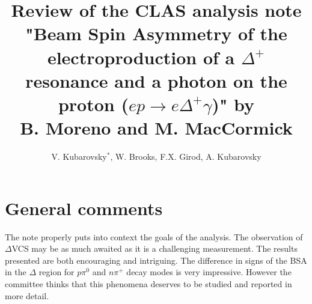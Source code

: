 \documentclass[11pt]{paper}
\title{Review of the CLAS analysis note\\ "Beam Spin Asymmetry of the electroproduction of a 
$\Delta^+$ resonance and a photon on the proton 
($ep\to e \Delta^+\gamma$)" by\\
B. Moreno and M. MacCormick 
  }
\author{V. Kubarovsky$^*$, W. Brooks, F.X. Girod, A. Kubarovsky}
\begin{document}
\maketitle

\let\oldthefootnote\thefootnote
\renewcommand{\thefootnote}{\fnsymbol{footnote}}
\let\thefootnote\oldthefootnote

\section*{General comments}


The note properly puts into context the goals of the analysis.
The observation of $\Delta$VCS may be as much awaited as it is a challenging measurement.
The results presented are both encouraging and intriguing. 
The difference in signs of the BSA in the $\Delta$ region for $p\pi^0$ and $n\pi^+$ decay modes
is very impressive. However the committee thinks that this phenomena deserves to be
studied and reported in more detail. 
\end{document}
